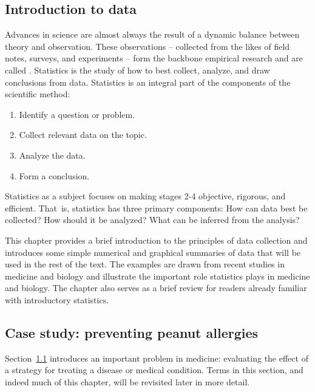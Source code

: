 

\begin{doublespace}

\chapter{Introduction to data}
\label{introductionToData}


Advances in science are almost always the result of a dynamic balance between theory and observation. These observations -- collected from the likes of field notes, surveys, and experiments -- form the backbone empirical research and are called . Statistics is the study of how to best collect, analyze, and draw conclusions from data. Statistics is an integral part of the components of the scientific method:  
\begin{enumerate}
\setlength{\itemsep}{0mm}
\item Identify a question or problem.
\item Collect relevant data on the topic.
\item Analyze the data.
\item Form a conclusion.
\end{enumerate}
Statistics as a subject focuses on making stages 2-4 objective, rigorous, and efficient. That~is, statistics has three primary components: How can data best be collected? How should it be analyzed? What can be inferred from the analysis?  

This chapter provides a brief introduction to the principles of data collection and introduces some simple numerical and graphical summaries of data that will be used in the rest of the text.  The examples are drawn from recent studies in medicine and biology and illustrate the important role statistics plays in medicine and biology.  The chapter also serves as a brief review for readers already familiar with introductory statistics.


\section[Case study]{Case study: preventing peanut allergies}
\label{leapCaseStudy}


Section~\ref{leapCaseStudy} introduces an important problem in medicine: evaluating the effect of a strategy for treating a disease or medical condition. Terms in this section, and indeed much of this chapter, will be revisited later in more detail.


\end{doublespace}
